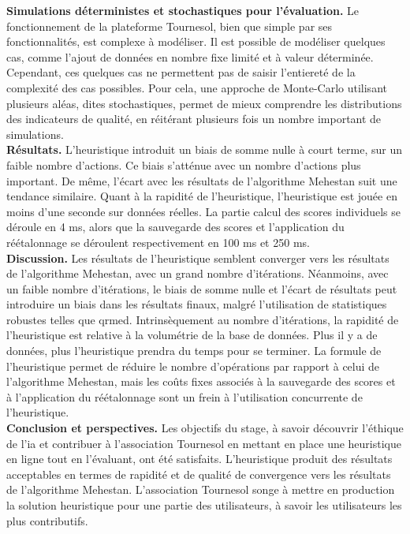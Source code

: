 \textbf{Simulations déterministes et stochastiques pour l'évaluation.} Le fonctionnement de la plateforme Tournesol, bien que simple par ses fonctionnalités, est complexe à modéliser. Il est possible de modéliser quelques cas, comme l'ajout de données en nombre fixe limité et à valeur déterminée. Cependant, ces quelques cas ne permettent pas de saisir l'entiereté de la complexité des cas possibles. Pour cela, une approche de Monte-Carlo utilisant plusieurs aléas, dites stochastiques, permet de mieux comprendre les distributions des indicateurs de qualité, en réitérant plusieurs fois un nombre important de simulations.\\
\textbf{Résultats.} L'heuristique introduit un biais de somme nulle à court terme, sur un faible nombre d'actions. Ce biais s'atténue avec un nombre d'actions plus important. De même, l'écart avec les résultats de l'algorithme Mehestan suit une tendance similaire. Quant à la rapidité de l'heuristique, l'heuristique est jouée en moins d'une seconde sur données réelles. La partie calcul des scores individuels se déroule en 4 ms, alors que la sauvegarde des scores et l'application du réétalonnage se déroulent respectivement en 100 ms et 250 ms. \\
\textbf{Discussion.} Les résultats de l'heuristique semblent converger vers les résultats de l'algorithme Mehestan, avec un grand nombre d'itérations. Néanmoins, avec un faible nombre d'itérations, le biais de somme nulle et l'écart de résultats peut introduire un biais dans les résultats finaux, malgré l'utilisation de statistiques robustes telles que \gls{qrmed}.
Intrinsèquement au nombre d'itérations, la rapidité de l'heuristique est relative à la volumétrie de la base de données. Plus il y a de données, plus l'heuristique prendra du temps pour se terminer. La formule de l'heuristique permet de réduire le nombre d'opérations par rapport à celui de l'algorithme Mehestan, mais les coûts fixes associés à la sauvegarde des scores et à l'application du réétalonnage sont un frein à l'utilisation concurrente de l'heuristique.  \\
\textbf{Conclusion et perspectives.} Les objectifs du stage, à savoir découvrir l'éthique de l'\gls{ia} et contribuer à l'association Tournesol en mettant en place une heuristique en ligne tout en l'évaluant, ont été satisfaits. L'heuristique produit des résultats acceptables en termes de rapidité et de qualité de convergence vers les résultats de l'algorithme Mehestan. L'association Tournesol songe à mettre en production la solution heuristique pour une partie des utilisateurs, à savoir les utilisateurs les plus contributifs.
\pagebreak

